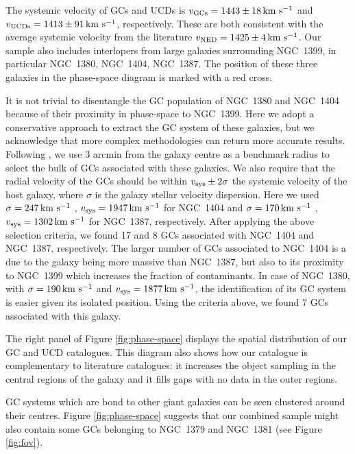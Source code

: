 The systemic velocity of GCs and UCDs is $v_{\rm GCs} = 1443 \pm 18 \mbox{\,km~s$^{-1}$}$ and 
$v_{\rm UCDs} = 1413 \pm 91 \mbox{\,km~s$^{-1}$}$, respectively. These are both consistent with 
the average systemic velocity from the literature $v_{\rm NED} = 1425 \pm 4 
\mbox{\,km~s$^{-1}$}$. Our sample also includes interlopers from large galaxies surrounding 
NGC~1399, in particular NGC~1380, NGC~1404, NGC~1387. The position of these 
three galaxies in the phase-space diagram is marked with a red cross. 

It is not trivial to disentangle the GC population of NGC~1380 and NGC~1404 
because of their proximity in phase-space to NGC~1399. 
Here we adopt a conservative approach to extract the GC system of these 
galaxies, but we acknowledge that more complex methodologies can return more 
accurate results. Following \citet{Schuberth}, we use 3 arcmin from the galaxy 
centre as a benchmark radius to select the bulk of GCs associated with these 
galaxies. We also require that the radial velocity of the GCs should be within 
$v_{\rm sys} \pm 2\sigma$  the systemic velocity of the host galaxy, where 
$\sigma$ is the galaxy stellar velocity dispersion. Here we used $\sigma = 247 
\mbox{\,km~s$^{-1}$}$  \citep{Vanderbeke11}, $v_{\rm sys} = 1947 \mbox{\,km~s$^{-1}$}$ for NGC~1404 and $\sigma 
= 170 \mbox{\,km~s$^{-1}$}$ \citep{Wegner03}, $v_{\rm sys} = 1302\mbox{\,km~s$^{-1}$} $ for NGC~1387, 
respectively. After applying the above selection criteria, we found 17 and 8 
GCs associated with NGC~1404 and NGC~1387, respectively. The larger number of 
GCs associated to NGC~1404 is a due to the galaxy being more massive than 
NGC~1387, but also to its proximity to NGC~1399 which increases the fraction of 
contaminants.
In case of NGC~1380, with $\sigma = 190 \mbox{\,km~s$^{-1}$}$  \citep{Vanderbeke11} and $v_{\rm 
sys} = 1877 \mbox{\,km~s$^{-1}$}$, the identification of its GC system is easier given its 
isolated position. Using the criteria above, we found 7 GCs associated with 
this galaxy. 

The right panel of Figure \ref{fig:phase-space} displays the spatial 
distribution of our GC and UCD catalogues. This diagram also shows how our 
catalogue is complementary to literature catalogues: it increases the object 
sampling in the central regions of the galaxy and it fills gaps with no data in 
the outer regions. 

GC systems which are bond to other giant galaxies can be seen clustered around 
their centres. Figure \ref{fig:phase-space} suggests that our combined sample 
might also contain some GCs belonging to NGC~1379 and NGC~1381 (see Figure 
\ref{fig:fov}). 

